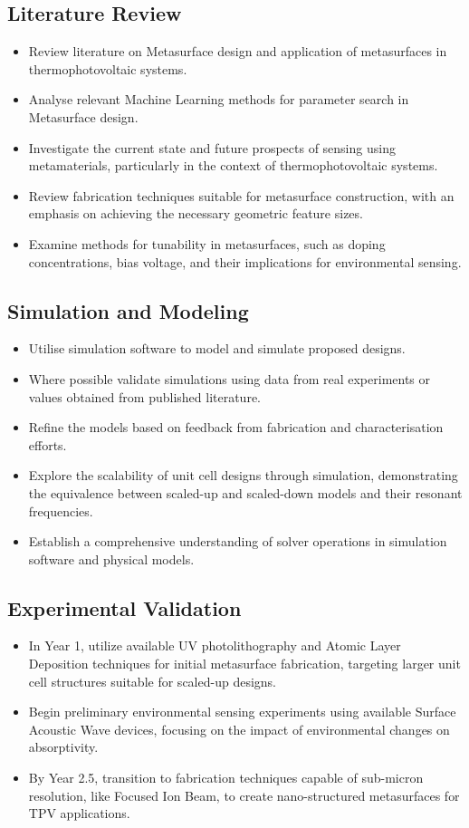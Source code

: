 \subsection{Literature Review}
\begin{itemize}
    \item Review literature on Metasurface design and application of metasurfaces in thermophotovoltaic systems.
    \item Analyse relevant Machine Learning methods for parameter search in Metasurface design.
    \item Investigate the current state and future prospects of sensing using metamaterials, particularly in the context of thermophotovoltaic systems.
    \item Review fabrication techniques suitable for metasurface construction, with an emphasis on achieving the necessary geometric feature sizes.
    \item Examine methods for tunability in metasurfaces, such as doping concentrations, bias voltage, and their implications for environmental sensing.
\end{itemize}

\subsection{Simulation and Modeling}
\begin{itemize}
    \item Utilise simulation software to model and simulate proposed designs.
    \item Where possible validate simulations using data from real experiments or values obtained from published literature.
    \item Refine the models based on feedback from fabrication and characterisation efforts.
    \item Explore the scalability of unit cell designs through simulation, demonstrating the equivalence between scaled-up and scaled-down models and their resonant frequencies.
    \item Establish a comprehensive understanding of solver operations in simulation software and physical models.
\end{itemize}


\subsection{Experimental Validation}
\begin{itemize}
    \item In Year 1, utilize available UV photolithography and Atomic Layer Deposition techniques for initial metasurface fabrication, targeting larger unit cell structures suitable for scaled-up designs.
    \item Begin preliminary environmental sensing experiments using available Surface Acoustic Wave devices, focusing on the impact of environmental changes on absorptivity.
    \item By Year 2.5, transition to fabrication techniques capable of sub-micron resolution, like Focused Ion Beam, to create nano-structured metasurfaces for TPV applications.
\end{itemize}

